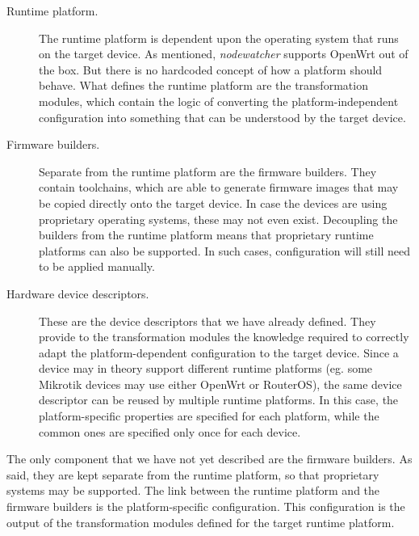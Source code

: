 \documentclass[5p,sort&compress]{elsarticle}
\newcommand{\nodewatcher}{\textit{nodewatcher}}
\begin{document}
\begin{description}
    \item[Runtime platform.] The runtime platform is dependent upon the operating system that runs on the target device.
    As mentioned, \nodewatcher{} supports OpenWrt out of the box.
    But there is no hardcoded concept of how a platform should behave.
    What defines the runtime platform are the transformation modules, which contain the logic of converting the platform-independent configuration into something that can be understood by the target device.

    \item[Firmware builders.] Separate from the runtime platform are the firmware builders.
    They contain toolchains, which are able to generate firmware images that may be copied directly onto the target device.
    In case the devices are using proprietary operating systems, these may not even exist.
    Decoupling the builders from the runtime platform means that proprietary runtime platforms can also be supported.
    In such cases, configuration will still need to be applied manually.

    \item[Hardware device descriptors.] These are the device descriptors that we have already defined.
    They provide to the transformation modules the knowledge required to correctly adapt the platform-dependent configuration to the target device.
    Since a device may in theory support different runtime platforms (eg. some Mikrotik devices may use either OpenWrt or RouterOS), the same device descriptor can be reused by multiple runtime platforms.
    In this case, the platform-specific properties are specified for each platform, while the common ones are specified only once for each device.
\end{description}

The only component that we have not yet described are the firmware builders.
As said, they are kept separate from the runtime platform, so that proprietary systems may be supported.
The link between the runtime platform and the firmware builders is the platform-specific configuration.
This configuration is the output of the transformation modules defined for the target runtime platform.
\end{document}
